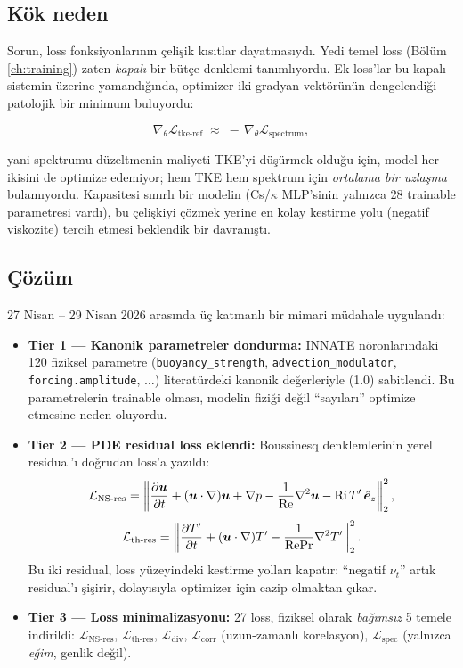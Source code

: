 \subsection*{Kök neden}

Sorun, loss fonksiyonlarının çelişik kısıtlar dayatmasıydı. Yedi temel loss (Bölüm \ref{ch:training}) zaten \textit{kapalı} bir bütçe denklemi tanımlıyordu. Ek loss'lar bu kapalı sistemin üzerine yamandığında, optimizer iki gradyan vektörünün dengelendiği patolojik bir minimum buluyordu:

\begin{equation}
    \nabla_\theta \mathcal{L}_{\text{tke-ref}} \;\approx\; -\,\nabla_\theta \mathcal{L}_{\text{spectrum}},
\end{equation}

yani spektrumu düzeltmenin maliyeti TKE'yi düşürmek olduğu için, model her ikisini de optimize edemiyor; hem TKE hem spektrum için \textit{ortalama bir uzlaşma} bulamıyordu. Kapasitesi sınırlı bir modelin (Cs/$\kappa$ MLP'sinin yalnızca 28 trainable parametresi vardı), bu çelişkiyi çözmek yerine en kolay kestirme yolu (negatif viskozite) tercih etmesi beklendik bir davranıştı.

\subsection*{Çözüm}

27 Nisan -- 29 Nisan 2026 arasında üç katmanlı bir mimari müdahale uygulandı:

\begin{itemize}
    \item \textbf{Tier 1 --- Kanonik parametreler dondurma:} INNATE nöronlarındaki 120 fiziksel parametre (\texttt{buoyancy\_strength}, \texttt{advection\_modulator}, \texttt{forcing.amplitude}, $\ldots$) literatürdeki kanonik değerleriyle (1.0) sabitlendi. Bu parametrelerin trainable olması, modelin fiziği değil ``sayıları'' optimize etmesine neden oluyordu.
    \item \textbf{Tier 2 --- PDE residual loss eklendi:} Boussinesq denklemlerinin yerel residual'ı doğrudan loss'a yazıldı:
    \begin{equation}
        \mathcal{L}_{\text{NS-res}} = \left\| \frac{\partial \bm{u}}{\partial t} + (\bm{u}\cdot\nabla)\bm{u} + \nabla p - \frac{1}{\mathrm{Re}}\nabla^2\bm{u} - \mathrm{Ri}\,T'\,\hat{\bm{e}}_z \right\|_2^2,
    \end{equation}
    \begin{equation}
        \mathcal{L}_{\text{th-res}} = \left\| \frac{\partial T'}{\partial t} + (\bm{u}\cdot\nabla)T' - \frac{1}{\mathrm{Re} \mathrm{Pr}}\nabla^2 T' \right\|_2^2.
    \end{equation}
    Bu iki residual, loss yüzeyindeki kestirme yolları kapatır: ``negatif $\nu_t$'' artık residual'ı şişirir, dolayısıyla optimizer için cazip olmaktan çıkar.
    \item \textbf{Tier 3 --- Loss minimalizasyonu:} 27 loss, fiziksel olarak \textit{bağımsız} 5 temele indirildi:
    $\mathcal{L}_{\text{NS-res}}$, $\mathcal{L}_{\text{th-res}}$, $\mathcal{L}_{\text{div}}$, $\mathcal{L}_{\text{corr}}$ (uzun-zamanlı korelasyon), $\mathcal{L}_{\text{spec}}$ (yalnızca \textit{eğim}, genlik değil).
\end{itemize}

